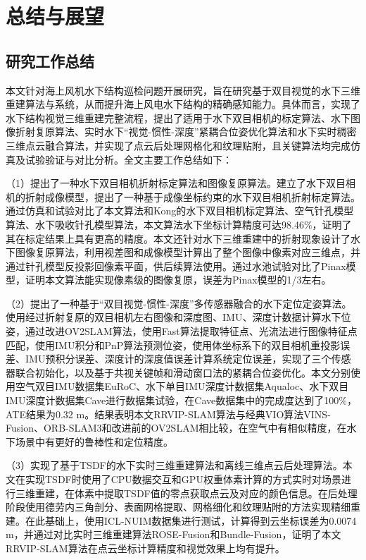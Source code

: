 

\chapter{总结与展望}

\section{研究工作总结}

本文针对海上风机水下结构巡检问题开展研究，旨在研究基于双目视觉的水下三维重建算法与系统，从而提升海上风电水下结构的精确感知能力。具体而言，实现了水下结构视觉三维重建完整流程，提出了适用于水下双目相机的标定算法、水下图像折射复原算法、实时水下“视觉-惯性-深度”紧耦合位姿优化算法和水下实时稠密三维点云融合算法，并实现了点云后处理网格化和纹理贴附，且关键算法均完成仿真及试验验证与对比分析。全文主要工作总结如下：

（1）提出了一种水下双目相机折射标定算法和图像复原算法。建立了水下双目相机的折射成像模型，提出了一种基于成像坐标约束的水下双目相机折射标定算法。通过仿真和试验对比了本文算法和Kong的水下双目相机标定算法、空气针孔模型算法、水下吸收针孔模型算法，本文算法水下坐标计算精度可达98.46\%，证明了其在标定结果上具有更高的精度。本文还针对水下三维重建中的折射现象设计了水下图像复原算法，利用视差图和成像模型计算出了整个图像中像素对应三维点，并通过针孔模型反投影回像素平面，供后续算法使用。通过水池试验对比了Pinax模型，证明本文算法能实现像素级的图像复原，误差为Pinax模型的1/3左右。

（2）提出了一种基于“双目视觉-惯性-深度”多传感器融合的水下定位定姿算法。使用经过折射复原的双目相机左右图像和深度图、IMU、深度计数据计算水下位姿，通过改进OV2SLAM算法，使用Fast算法提取特征点、光流法进行图像特征点匹配，使用IMU积分和PnP算法预测位姿，使用体坐标系下的双目相机重投影误差、IMU预积分误差、深度计的深度值误差计算系统定位误差，实现了三个传感器联合初始化，以及基于共视关键帧和滑动窗口法的紧耦合位姿优化。本文分别使用空气双目IMU数据集EuRoC、水下单目IMU深度计数据集Aqualoc、水下双目IMU深度计数据集Cave进行数据集试验，在Cave数据集中的完成度达到了100\%，ATE结果为0.32 m。结果表明本文RRVIP-SLAM算法与经典VIO算法VINS-Fusion、ORB-SLAM3和改进前的OV2SLAM相比较，在空气中有相似精度，在水下场景中有更好的鲁棒性和定位精度。

（3）实现了基于TSDF的水下实时三维重建算法和离线三维点云后处理算法。本文在实现TSDF时使用了CPU数据交互和GPU权重体素计算的方式实时对场景进行三维重建，在体素中提取TSDF值的零点获取点云及对应的颜色信息。在后处理阶段使用德劳内三角剖分、表面网格提取、网格细化和纹理贴附的方法实现精细重建。在此基础上，使用ICL-NUIM数据集进行测试，计算得到云坐标误差为0.0074 m，并通过对比实时三维重建算法ROSE-Fusion和Bundle-Fusion，证明了本文RRVIP-SLAM算法在点云坐标计算精度和视觉效果上均有提升。

